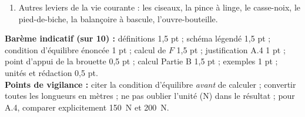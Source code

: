 \documentclass[11pt]{article}
\begin{document}
\begin{corrige}
\begin{enumerate}
L'effort étant également réparti sur les deux mains : $F_{\text{main}} = \dfrac{166{,}7}{2} \approx \SI{83,3}{N}$ par main.
\item Autres leviers de la vie courante : les ciseaux, la pince à linge, le casse-noix, le pied-de-biche, la balançoire à bascule, l'ouvre-bouteille.
\end{enumerate}
\textbf{Barème indicatif (sur 10) :} définitions 1,5 pt ; schéma légendé 1,5 pt ; condition d'équilibre énoncée 1 pt ; calcul de $F$ 1,5 pt ; justification A.4 1 pt ; point d'appui de la brouette 0,5 pt ; calcul Partie B 1,5 pt ; exemples 1 pt ; unités et rédaction 0,5 pt.\\
\textbf{Points de vigilance :} citer la condition d'équilibre \emph{avant} de calculer ; convertir toutes les longueurs en mètres ; ne pas oublier l'unité (N) dans le résultat ; pour A.4, comparer explicitement \SI{150}{N} et \SI{200}{N}.
\end{corrige}
\end{document}

